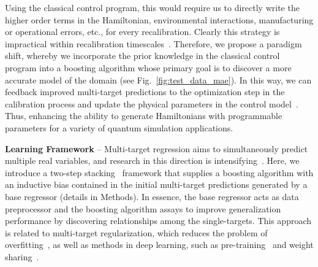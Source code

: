 \documentclass[aps,twocolumn,superscriptaddress,floatfix,preprintnumbers,showkeys]{revtex4}
\begin{document}
Using the classical control program, this would require us to directly write the higher order terms in the Hamiltonian, environmental interactions, manufacturing or operational errors, etc., for every recalibration. Clearly this strategy is impractical within recalibration timescales~\cite{Linke_2017, Kelly_2018_1}. Therefore, we propose a paradigm shift, whereby we incorporate the prior knowledge in the classical control program into a boosting algorithm whose primary goal is to discover a more accurate model of the domain (see Fig.~\ref{fig:test_data_mae}). In this way, we can feedback improved multi-target predictions to the optimization step in the calibration process and update the physical parameters in the control model~\cite{Neill_2018}. Thus, enhancing the ability to generate Hamiltonians with programmable parameters for a variety of quantum simulation applications.

\textbf{Learning Framework} -- Multi-target regression aims to simultaneously predict multiple real variables, and research in this direction is intensifying~\cite{Borchani_2015, Waegeman_2019}. Here, we introduce a two-step stacking~\cite{Wolpert_1992, Breiman_1996, Breiman_1997_2, Borchani_2015, Waegeman_2019} framework that supplies a boosting algorithm with an inductive bias contained in the initial multi-target predictions generated by a base regressor (details in Methods). In essence, the base regressor acts as data preprocessor and the boosting algorithm assays to improve generalization performance by discovering relationships among the single-targets. This approach is related to multi-target regularization, which reduces the problem of overfitting~\cite{Breiman_1997_2, Borchani_2015, Waegeman_2019}, as well as methods in deep learning, such as pre-training~\cite{Erhan_2010} and weight sharing~\cite{Caruana_1997}. 
\end{document}
